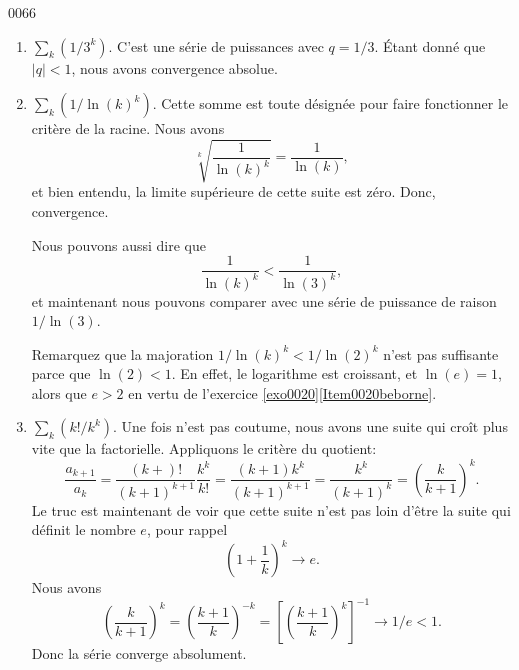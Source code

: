 
\begin{corrige}{0066}

\begin{enumerate}

\item 
$\sum_k(1/3^k)$.
C'est une série de puissances avec $q=1/3$. Étant donné que $| q |<1$, nous avons convergence absolue.

\item
$\sum_k(1/\ln(k)^k)$. Cette somme est toute désignée pour faire fonctionner le critère de la racine. Nous avons
\begin{equation}
	\sqrt[k]{\frac{1}{ \ln(k)^k }}=\frac{1}{ \ln(k) },
\end{equation}
 et bien entendu, la limite supérieure de cette suite est zéro. Donc, convergence.

\begin{alternative}
	Nous pouvons aussi dire que
\begin{equation}
	\frac{1}{ \ln(k)^k }<\frac{1}{ \ln(3)^k },
\end{equation}
et maintenant nous pouvons comparer avec une série de puissance de raison $1/\ln(3)$.

Remarquez que la majoration $1/\ln(k)^k<1/\ln(2)^k$ n'est pas suffisante parce que $\ln(2)<1$. En effet, le logarithme est croissant, et $\ln(e)=1$, alors que $e>2$ en vertu de l'exercice \ref{exo0020}\ref{Item0020beborne}.
\end{alternative}

\item
$\sum_k(k!/k^k)$.
Une fois n'est pas coutume, nous avons une suite qui croît plus vite que la factorielle. Appliquons le critère du quotient:
\begin{equation}
\frac{ a_{k+1} }{ a_k }=\frac{ (k+)! }{ (k+1)^{k+1} }\frac{ k^k }{ k! }=\frac{ (k+1)k^k }{ (k+1)^{k+1} }=\frac{ k^k }{ (k+1)^k }=\left( \frac{ k }{ k+1 } \right)^k.	
\end{equation}
Le truc est maintenant de voir que cette suite n'est pas loin d'être la suite qui définit le nombre $e$, pour rappel
\begin{equation}
	\left( 1+\frac{1}{ k } \right)^k\to e.
\end{equation}
Nous avons
\begin{equation}
	\left( \frac{ k }{ k+1 } \right)^k=\left( \frac{ k+1 }{ k } \right)^{-k}=\left[ \left( \frac{ k+1 }{ k } \right)^k \right]^{-1}\to 1/e<1.
\end{equation}
Donc la série converge absolument.


\end{enumerate}
\end{corrige}
